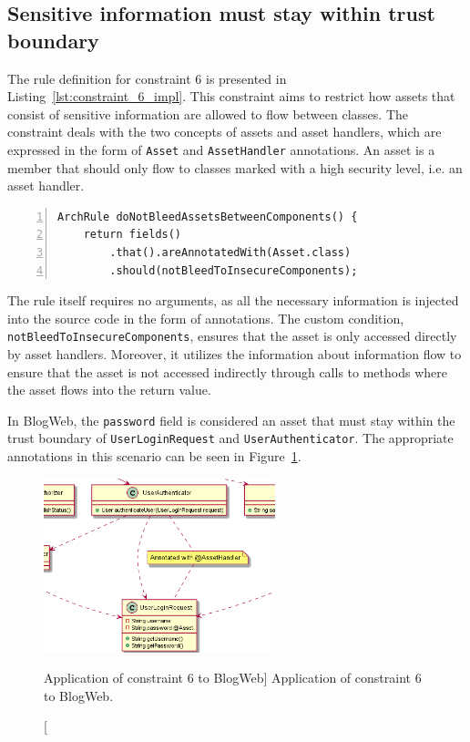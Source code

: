 \subsection{Sensitive information must stay within trust boundary}
The rule definition for constraint 6 is presented in Listing~\ref{lst:constraint_6_impl}.
This constraint aims to restrict how assets that consist of sensitive information are allowed to flow between classes. The constraint deals with the two concepts of assets and asset handlers, which are expressed in the form of \texttt{Asset} and \texttt{AssetHandler} annotations. An asset is a member that should only flow to classes marked with a high security level, i.e. an asset handler.

\begin{minipage}{\linewidth}
\begin{lstlisting}[caption={Rule definition for constraint 6.}, captionpos=b, label=lst:constraint_6_impl, numbers=left]
ArchRule doNotBleedAssetsBetweenComponents() {
    return fields()
        .that().areAnnotatedWith(Asset.class)
        .should(notBleedToInsecureComponents);
\end{lstlisting}
\end{minipage}

The rule itself requires no arguments, as all the necessary information is injected into the source code in the form of annotations. The custom condition, \texttt{notBleedTo\-InsecureComponents}, ensures that the asset is only accessed directly by asset handlers. Moreover, it utilizes the information about information flow to ensure that the asset is not accessed indirectly through calls to methods where the asset flows into the return value.

In BlogWeb, the \texttt{password} field is considered an asset that must stay within the trust boundary of \texttt{UserLoginRequest} and \texttt{UserAuthenticator}. The appropriate annotations in this scenario can be seen in Figure~\ref{fig:assets_toy_system}.

\begin{figure}[ht]
    \centering
    \includegraphics[width=0.6\textwidth]{figure/toyexamples/Assets.png}
    \caption
        [Application of constraint 6 to BlogWeb]
        {Application of constraint 6 to BlogWeb.}
    \label{fig:assets_toy_system}
\end{figure}

